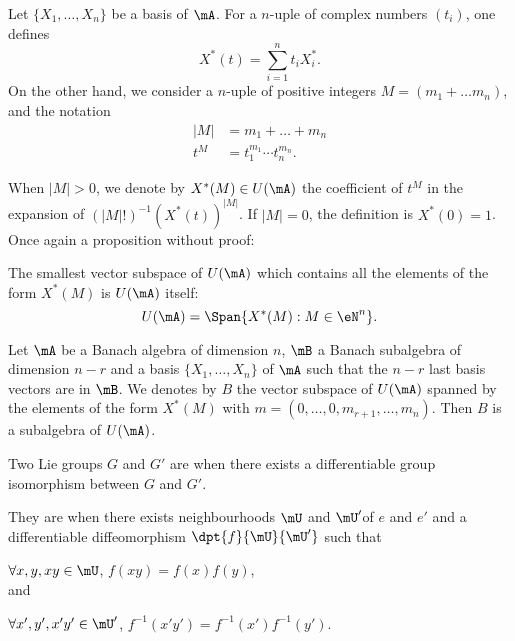 Let $\{X_1,\ldots,X_n\}$ be a basis of $\mA$. For a $n$-uple of complex numbers $(t_i)$, one defines
\begin{equation}
X^*(t)=\sum_{i=1}^nt_iX^*_i.
\end{equation}
On the other hand, we consider a $n$-uple of positive integers $M=(m_1+\ldots m_n)$, and the notation 
\begin{equation}
\begin{split}
   |M|&=m_1+\ldots+m_n\\
   t^M&=t_1^{m_1}\cdots t_n^{m_n}.
\end{split}
\end{equation}

When $|M|>0$, we denote by $X^*(M)\in U(\mA)$ the coefficient of $t^M$ in the expansion of $(|M|!)^{-1} (X^*(t))^{|M|}$. If $|M|=0$, the definition is $X^*(0)=1$. Once again a proposition without proof:

\begin{proposition}
The smallest vector subspace of $U(\mA)$ which contains all the elements of the form $X^*(M)$ is $U(\mA)$ itself:
\[
   U(\mA)=\Span\{ X^*(M):M\in \eN^n \}.
\]

\end{proposition}


\begin{corollary}
Let $\mA$ be a Banach algebra of dimension $n$, $\mB$ a Banach subalgebra of dimension $n-r$ and a basis $\{X_1,\ldots,X_n\}$ of $\mA$ such that the $n-r$ last basis vectors are in $\mB$. We denotes by $B$ the vector subspace of $U(\mA)$ spanned by the elements of the form $X^*(M)$ with $m=(0,\ldots,0,m_{r+1},\ldots,m_n)$. Then $B$ is a subalgebra of $U(\mA)$.
 \label{cor:/24}
\end{corollary}

\begin{definition}
Two Lie groups $G$ and $G'$ are  when there exists a differentiable group isomorphism between $G$ and $G'$.

They are  when there exists neighbourhoods $\mU$ and $\mU'$of $e$ and $e'$ and a differentiable diffeomorphism $\dpt{f}{\mU}{\mU'}$ such that

$\forall x,y,xy\in\mU$, $f(xy)=f(x)f(y)$, \\and

$\forall x',y',x'y'\in\mU'$, $f^{-1}(x'y')=f^{-1}(x')f^{-1}(y')$.
\end{definition}

